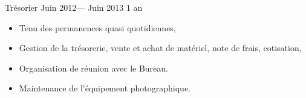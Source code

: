 \volunteerposition%
{Trésorier}%
{Juin 2012--- Juin 2013}%
{1 an}%
{
	\begin{itemize}

    \item Tenu des permanences quasi quotidiennes,
    \item Gestion de la trésorerie, vente et achat de matériel, note de frais, cotisation,
    \item Organisation de réunion avec le Bureau.
    \item Maintenance de l'équipement photographique.
	\end{itemize}
}
